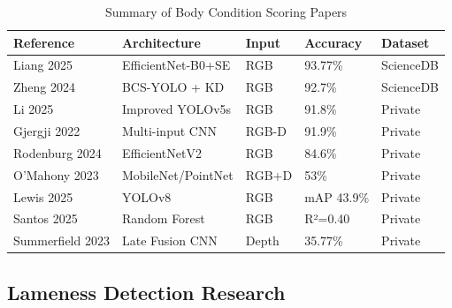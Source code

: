\begin{table}[h]
\centering
\caption{Summary of Body Condition Scoring Papers}
\label{tab:bcs_papers}
\begin{tabular}{|p{2.8cm}|p{4cm}|p{1.8cm}|p{2.2cm}|p{2cm}|}
\hline
\textbf{Reference} & \textbf{Architecture} & \textbf{Input} & \textbf{Accuracy} & \textbf{Dataset} \\
\hline
Liang 2025 & EfficientNet-B0+SE & RGB & 93.77\% & ScienceDB \\
\hline
Zheng 2024 & BCS-YOLO + KD & RGB & 92.7\% & ScienceDB \\
\hline
Li 2025 & Improved YOLOv5s & RGB & 91.8\% & Private \\
\hline
Gjergji 2022 & Multi-input CNN & RGB-D & 91.9\% & Private \\
\hline
Rodenburg 2024 & EfficientNetV2 & RGB & 84.6\% & Private \\
\hline
O'Mahony 2023 & MobileNet/PointNet & RGB+D & 53\% & Private \\
\hline
Lewis 2025 & YOLOv8 & RGB & mAP 43.9\% & Private \\
\hline
Santos 2025 & Random Forest & RGB & R²=0.40 & Private \\
\hline
Summerfield 2023 & Late Fusion CNN & Depth & 35.77\% & Private \\
\hline
\end{tabular}
\end{table}

\subsection{Lameness Detection Research}

